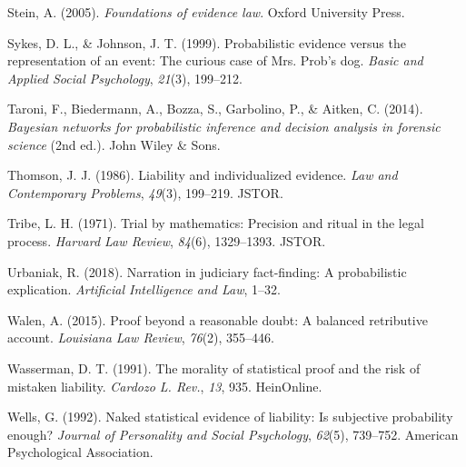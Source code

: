 \documentclass[10pt,dvipsnames,enabledeprecatedfontcommands]{scrartcl}
\begin{document}
\leavevmode\hypertarget{ref-Stein05}{}%
Stein, A. (2005). \emph{Foundations of evidence law}. Oxford University
Press.

\leavevmode\hypertarget{ref-sykes1999}{}%
Sykes, D. L., \& Johnson, J. T. (1999). Probabilistic evidence versus
the representation of an event: The curious case of Mrs. Prob's dog.
\emph{Basic and Applied Social Psychology}, \emph{21}(3), 199--212.

\leavevmode\hypertarget{ref-taroni2006bayesian}{}%
Taroni, F., Biedermann, A., Bozza, S., Garbolino, P., \& Aitken, C.
(2014). \emph{Bayesian networks for probabilistic inference and decision
analysis in forensic science} (2nd ed.). John Wiley \& Sons.

\leavevmode\hypertarget{ref-thomson1986liability}{}%
Thomson, J. J. (1986). Liability and individualized evidence. \emph{Law
and Contemporary Problems}, \emph{49}(3), 199--219. JSTOR.

\leavevmode\hypertarget{ref-tribe1971trial}{}%
Tribe, L. H. (1971). Trial by mathematics: Precision and ritual in the
legal process. \emph{Harvard Law Review}, \emph{84}(6), 1329--1393.
JSTOR.

\leavevmode\hypertarget{ref-urbaniak2018narration}{}%
Urbaniak, R. (2018). Narration in judiciary fact-finding: A
probabilistic explication. \emph{Artificial Intelligence and Law},
1--32.

\leavevmode\hypertarget{ref-walen2015}{}%
Walen, A. (2015). Proof beyond a reasonable doubt: A balanced
retributive account. \emph{Louisiana Law Review}, \emph{76}(2),
355--446.

\leavevmode\hypertarget{ref-wasserman1991morality}{}%
Wasserman, D. T. (1991). The morality of statistical proof and the risk
of mistaken liability. \emph{Cardozo L. Rev.}, \emph{13}, 935.
HeinOnline.

\leavevmode\hypertarget{ref-wells1992naked}{}%
Wells, G. (1992). Naked statistical evidence of liability: Is subjective
probability enough? \emph{Journal of Personality and Social Psychology},
\emph{62}(5), 739--752. American Psychological Association.
\end{document}
